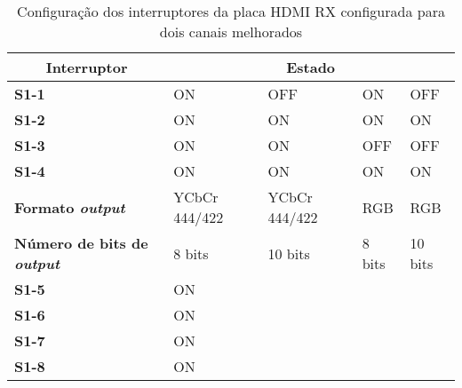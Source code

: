 \begin{table}[h!]
	\centering
		\begin{tabular}{lllll}
			\hline
			\multicolumn{1}{c}{\textbf{Interruptor}}               & \multicolumn{4}{c}{\textbf{Estado}}              \\ \hline
			\multicolumn{1}{l|}{\textbf{S1-1}}                     & ON            & OFF           & ON     & OFF     \\
			\multicolumn{1}{l|}{\textbf{S1-2}}                     & ON            & ON            & ON     & ON      \\
			\multicolumn{1}{l|}{\textbf{S1-3}}                     & ON            & ON            & OFF    & OFF     \\
			\multicolumn{1}{l|}{\textbf{S1-4}}                     & ON            & ON            & ON     & ON      \\
			\multicolumn{1}{l|}{\textbf{Formato \textit{output}}}           & YCbCr 444/422 & YCbCr 444/422 & RGB    & RGB     \\
			\multicolumn{1}{l|}{\textbf{Número de bits de \textit{output}}} & 8 bits        & 10 bits       & 8 bits & 10 bits \\
			\multicolumn{1}{l|}{\textbf{S1-5}}                     & \multicolumn{4}{l}{ON}                           \\
			\multicolumn{1}{l|}{\textbf{S1-6}}                     & \multicolumn{4}{l}{ON}                           \\
			\multicolumn{1}{l|}{\textbf{S1-7}}                     & \multicolumn{4}{l}{ON}                           \\
			\multicolumn{1}{l|}{\textbf{S1-8}}                     & \multicolumn{4}{l}{ON}                           \\ \hline
		\end{tabular}%
	\captionsetup{width=0.9\linewidth}
	\caption{Configuração dos interruptores da placa HDMI RX configurada para dois canais melhorados}
	\label{table:HDMI_2ch_melhoradp_RX}
\end{table}

